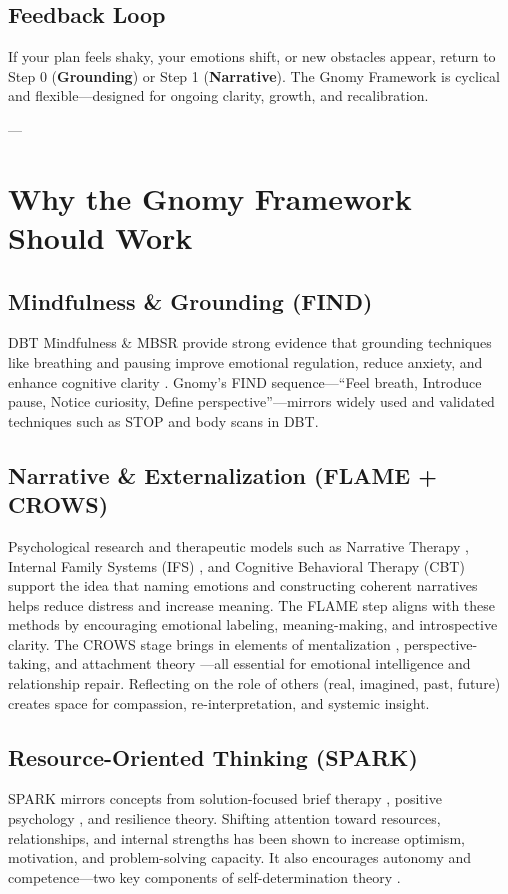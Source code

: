 \documentclass{article}
\begin{document}
\subsection{Feedback Loop}
If your plan feels shaky, your emotions shift, or new obstacles appear, return to Step 0 (\textbf{Grounding}) or Step 1 (\textbf{Narrative}). The Gnomy Framework is cyclical and flexible—designed for ongoing clarity, growth, and recalibration.

---

\section{Why the Gnomy Framework Should Work}

\subsection{Mindfulness \& Grounding (FIND)}
DBT Mindfulness \& MBSR provide strong evidence that grounding techniques like breathing and pausing improve emotional regulation, reduce anxiety, and enhance cognitive clarity \cite{linehan1993cognitive, kabat1990full}. Gnomy's FIND sequence—``Feel breath, Introduce pause, Notice curiosity, Define perspective''—mirrors widely used and validated techniques such as STOP and body scans in DBT.

\subsection{Narrative \& Externalization (FLAME + CROWS)}
Psychological research and therapeutic models such as Narrative Therapy \cite{white1990narrative}, Internal Family Systems (IFS) \cite{schwartz1995internal}, and Cognitive Behavioral Therapy (CBT) \cite{beck1979cognitive} support the idea that naming emotions and constructing coherent narratives helps reduce distress and increase meaning. The FLAME step aligns with these methods by encouraging emotional labeling, meaning-making, and introspective clarity. The CROWS stage brings in elements of mentalization \cite{fonagy2002affect}, perspective-taking, and attachment theory \cite{bowlby1969attachment}—all essential for emotional intelligence and relationship repair. Reflecting on the role of others (real, imagined, past, future) creates space for compassion, re-interpretation, and systemic insight.

\subsection{Resource-Oriented Thinking (SPARK)}
SPARK mirrors concepts from solution-focused brief therapy \cite{de1997building}, positive psychology \cite{seligman2011flourish}, and resilience theory. Shifting attention toward resources, relationships, and internal strengths has been shown to increase optimism, motivation, and problem-solving capacity. It also encourages autonomy and competence—two key components of self-determination theory \cite{ryan2000self}.
\end{document}
